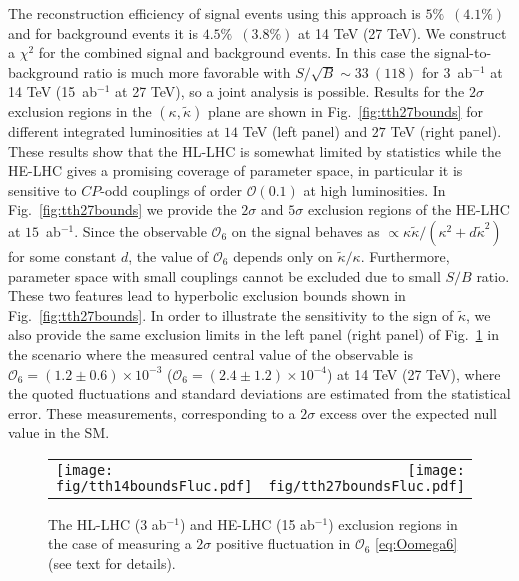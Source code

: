 \documentclass[11pt,a4paper]{article}
\newcommand{\mc}[1]{\mathcal{#1}}
\begin{document}
The reconstruction efficiency of signal events using this approach is $5\%$~$(4.1\%)$ and for background events it is $4.5\%$~$(3.8\%)$ at 14 TeV (27 TeV). We construct a $\chi^2$ for the combined signal and background events. In this case the signal-to-background ratio is much more favorable with $S/\sqrt{B}\sim 33~(118)$ for 3~ab${}^{-1}$ at 14 TeV (15~ab${}^{-1}$ at 27 TeV), so a joint analysis is possible. Results for the $2\sigma$  exclusion regions in the $(\kappa,\tilde\kappa)$ plane are shown in Fig.~\ref{fig:tth27bounds} for different integrated luminosities at $14$ TeV (left panel) and $27$ TeV (right panel). These results show that the HL-LHC is somewhat limited by statistics while the HE-LHC gives a promising coverage of parameter space, in particular it is sensitive to $CP$-odd couplings of order $\mc{O}(0.1)$ at high luminosities. In Fig.~\ref{fig:tth27bounds} we provide the $2\sigma$ and $5\sigma$ exclusion regions of the HE-LHC at $15$~ab$^{-1}$. Since the observable $\mc{O}_6$ on the signal behaves as $\propto \kappa\tilde\kappa/(\kappa^2+d \tilde \kappa^2)$ for some constant $d$, the value of $\mc{O}_6$ depends only on $\tilde \kappa/\kappa$. Furthermore, parameter space with small couplings cannot be excluded due to small $S/B$ ratio. These two features lead
to hyperbolic exclusion bounds shown in Fig.~\ref{fig:tth27bounds}. In order to illustrate the sensitivity to the sign of $\tilde\kappa$, we also provide the same exclusion limits in the left panel (right panel) of Fig.~\ref{fig:tthboundsFluc} in the scenario where the measured central value of the observable is $\mc{O}_6=(1.2 \pm 0.6) \times 10^{-3}$ ($\mc{O}_6=(2.4 \pm 1.2) \times 10^{-4}$) at 14 TeV (27 TeV), where the quoted fluctuations and standard deviations are estimated from the statistical error. These measurements, corresponding to a $2\sigma$ excess over the expected null value in the SM.

\begin{figure}[!t]
	\centering 	
	\begin{tabular}{lr}
		\texttt{[image: fig/tth14boundsFluc.pdf]} & \texttt{[image: fig/tth27boundsFluc.pdf]}
	\end{tabular}
	\caption{The HL-LHC (3 ab$^{-1}$) and HE-LHC (15 ab$^{-1}$) exclusion regions in the case of measuring a $2\sigma$ positive fluctuation in $\mc{O}_6$ \eqref{eq:Oomega6} (see text for details).}
	\label{fig:tthboundsFluc}
\end{figure}
\end{document}
